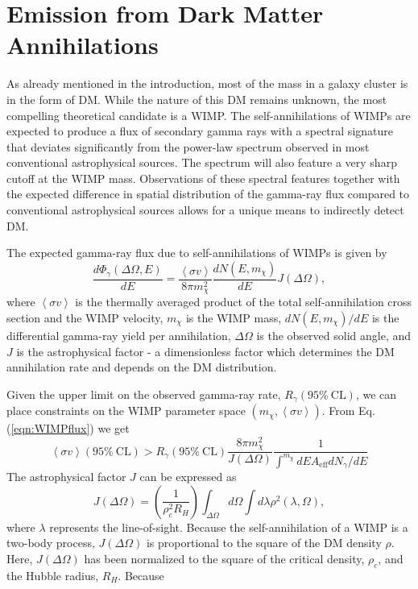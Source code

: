 \documentclass[12pt,manuscript]{aastex}
\newcommand{\expval}[1]{\left\langle #1 \right\rangle}
\begin{document}
\section{Emission from Dark Matter Annihilations}
As already mentioned in the introduction, most of the mass in a galaxy cluster is in the form of DM. While the nature of this DM remains unknown, the most compelling theoretical candidate is a WIMP. The self-annihilations of WIMPs are expected to produce a flux of secondary gamma rays with a spectral signature that deviates significantly from the power-law spectrum observed in most conventional astrophysical sources. The spectrum will also feature a very sharp cutoff at the WIMP mass. Observations of these spectral features together with the expected difference in spatial distribution of the gamma-ray flux compared to conventional astrophysical sources allows for a unique means to indirectly detect DM.

The expected gamma-ray flux due to self-annihilations of WIMPs is given by 
\begin{equation}
\frac{d\Phi_{\gamma}(\Delta\Omega,E)}{dE}=\frac{\expval{\sigma v}}{8\pi m_{\chi}^{2}}\frac{dN(E,m_{\chi})}{dE} J(\Delta\Omega),
\label{eqn:WIMPflux}
\end{equation}
where $\expval{\sigma v}$ is the thermally averaged product of the total self-annihilation cross section and the WIMP velocity, $m_{\chi}$ is the WIMP mass, $dN(E,m_{\chi})/dE$ is the differential gamma-ray yield per annihilation, $\Delta\Omega$ is the observed solid angle, and $J$ is the astrophysical factor - a dimensionless factor which determines the DM annihilation rate and depends on the DM distribution.

Given the upper limit on the observed gamma-ray rate, $R_{\gamma}(95\%\ \mathrm{CL})$, we can place constraints on the WIMP parameter space $(m_{\chi}, \expval{\sigma v})$. From Eq. (\ref{eqn:WIMPflux}) we get
\begin{equation}
\expval{\sigma v}(95\%\ \mathrm{CL}) > R_{\gamma}(95\%\ \mathrm{CL}) \frac{8\pi m_{\chi}^{2}}{J(\Delta\Omega)}\frac{1}{\int^{m_{\chi}} dE A_{\mathrm{eff}}dN_{\gamma}/dE}
\end{equation}
The astrophysical factor $J$ can be expressed as
\begin{equation}
J(\Delta\Omega)=\left(\frac{1}{\rho_{c}^{2}R_{H}}\right) \int_{\Delta\Omega}d\Omega\int d\lambda \rho^{2}(\lambda,\Omega),
\end{equation}
where $\lambda$ represents the line-of-sight. Because the self-annihilation of a WIMP is a two-body process, $J(\Delta\Omega)$ is proportional to the square of the DM density $\rho$. Here, $J(\Delta\Omega)$ has been normalized to the square of the critical density, $\rho_{c}$, and the Hubble radius, $R_{H}$. Because 
\end{document}
